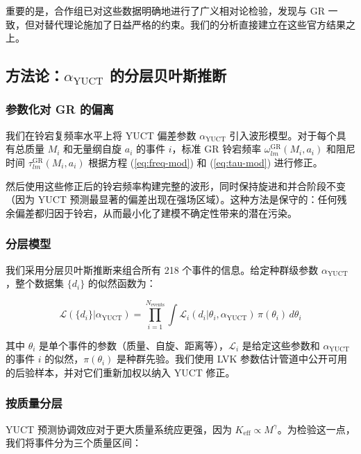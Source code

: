 \documentclass[11pt,a4paper]{article}
\theoremstyle{remark}
\newcommand{\Keff}{K_{\mathrm{eff}}}
\begin{document}
	重要的是，合作组已对这些数据明确地进行了广义相对论检验，发现与 GR 一致，但对替代理论施加了日益严格的约束。我们的分析直接建立在这些官方结果之上。
	
	\subsection{方法论：$\alpha_{\text{YUCT}}$ 的分层贝叶斯推断}
	
	\subsubsection{参数化对 GR 的偏离}
	
	我们在铃宕复频率水平上将 YUCT 偏差参数 $\alpha_{\text{YUCT}}$ 引入波形模型。对于每个具有总质量 $M_i$ 和无量纲自旋 $a_i$ 的事件 $i$，标准 GR 铃宕频率 $\omega_{lm}^{\text{GR}}(M_i, a_i)$ 和阻尼时间 $\tau_{lm}^{\text{GR}}(M_i, a_i)$ 根据方程 (\ref{eq:freq-mod}) 和 (\ref{eq:tau-mod}) 进行修正。
	
	然后使用这些修正后的铃宕频率构建完整的波形，同时保持旋进和并合阶段不变（因为 YUCT 预测最显著的偏差出现在强场区域）。这种方法是保守的：任何残余偏差都归因于铃宕，从而最小化了建模不确定性带来的潜在污染。
	
	\subsubsection{分层模型}
	
	我们采用分层贝叶斯推断来组合所有 218 个事件的信息。给定种群级参数 $\alpha_{\text{YUCT}}$，整个数据集 $\{d_i\}$ 的似然函数为：
	
	\begin{equation}
		\mathcal{L}(\{d_i\} | \alpha_{\text{YUCT}}) = \prod_{i=1}^{N_{\text{events}}} \int \mathcal{L}_i(d_i | \theta_i, \alpha_{\text{YUCT}}) \, \pi(\theta_i) \, d\theta_i
		\label{eq:hierarchical}
	\end{equation}
	
	其中 $\theta_i$ 是单个事件的参数（质量、自旋、距离等），$\mathcal{L}_i$ 是给定这些参数和 $\alpha_{\text{YUCT}}$ 的事件 $i$ 的似然，$\pi(\theta_i)$ 是种群先验。我们使用 LVK 参数估计管道中公开可用的后验样本，并对它们重新加权以纳入 YUCT 修正。
	
	\subsubsection{按质量分层}
	
	YUCT 预测协调效应对于更大质量系统应更强，因为 $\Keff \propto M^{\gamma}$。为检验这一点，我们将事件分为三个质量区间：
	
\end{document}
